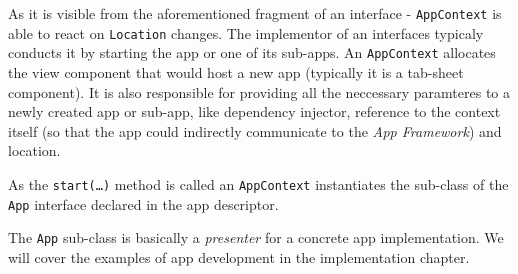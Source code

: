 As it is visible from the aforementioned fragment of an interface -
\texttt{AppContext} is able to react on \texttt{Location} changes. The
implementor of an interfaces typicaly conducts it by starting the app or one of
its sub-apps. An \texttt{AppContext} allocates the view component that would
host a new app (typically it is a tab-sheet component). It is also responsible
for providing all the neccessary paramteres to a newly created app or sub-app,
like dependency injector, reference to the context itself (so that the app could
indirectly communicate to the \emph{App Framework}) and location.

As the \texttt{start(\ldots)} method is called an \texttt{AppContext}
instantiates the sub-class of the \texttt{App} interface declared in the app
descriptor.

The \texttt{App} sub-class is basically a \emph{presenter} for a concrete app
implementation. We will cover the examples of app development in the
implementation chapter.
